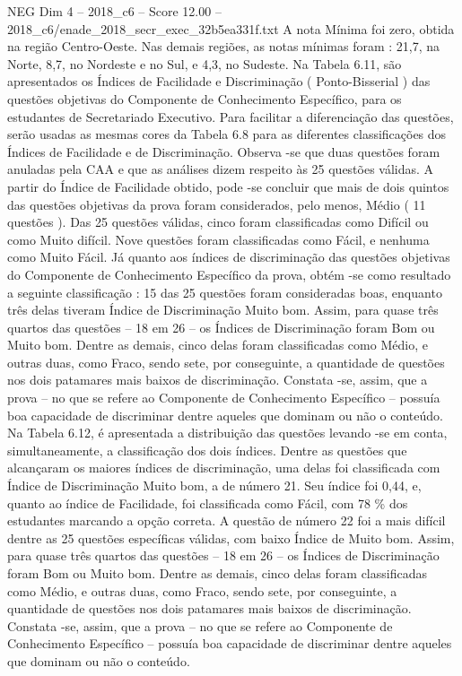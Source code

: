 \begin{textsample}{NEG Dim 4 – 2018\_c6 – Score 12.00 – 2018\_c6/enade\_2018\_secr\_exec\_32b5ea331f.txt}
A nota Mínima foi zero, obtida na região Centro-Oeste.
Nas demais regiões, as notas mínimas foram : 21,7, na Norte, 8,7, no Nordeste e no Sul, e 4,3, no Sudeste.
Na Tabela 6.11, são apresentados os Índices de Facilidade e Discriminação ( Ponto-Bisserial ) das questões objetivas do Componente de Conhecimento Específico, para os estudantes de Secretariado Executivo.
Para facilitar a diferenciação das questões, serão usadas as mesmas cores da Tabela 6.8 para as diferentes classificações dos Índices de Facilidade e de Discriminação.
Observa -se que duas questões foram anuladas pela CAA e que as análises dizem respeito às 25 questões válidas.
A partir do Índice de Facilidade obtido, pode -se concluir que mais de dois quintos das questões objetivas da prova foram considerados, pelo menos, Médio ( 11 questões ).
Das 25 questões válidas, cinco foram classificadas como Difícil ou como Muito difícil.
Nove questões foram classificadas como Fácil, e nenhuma como Muito Fácil.
Já quanto aos índices de discriminação das questões objetivas do Componente de Conhecimento Específico da prova, obtém -se como resultado a seguinte classificação : 15 das 25 questões foram consideradas boas, enquanto três delas tiveram Índice de Discriminação Muito bom.
Assim, para quase três quartos das questões – 18 em 26 – os Índices de Discriminação foram Bom ou Muito bom.
Dentre as demais, cinco delas foram classificadas como Médio, e outras duas, como Fraco, sendo sete, por conseguinte, a quantidade de questões nos dois patamares mais baixos de discriminação.
Constata -se, assim, que a prova – no que se refere ao Componente de Conhecimento Específico – possuía boa capacidade de discriminar dentre aqueles que dominam ou não o conteúdo.
Na Tabela 6.12, é apresentada a distribuição das questões levando -se em conta, simultaneamente, a classificação dos dois índices.
Dentre as questões que alcançaram os maiores índices de discriminação, uma delas foi classificada com Índice de Discriminação Muito bom, a de número 21.
Seu índice foi 0,44, e, quanto ao índice de Facilidade, foi classificada como Fácil, com 78 \% dos estudantes marcando a opção correta.
A questão de número 22 foi a mais difícil dentre as 25 questões específicas válidas, com baixo Índice de Muito bom.
Assim, para quase três quartos das questões – 18 em 26 – os Índices de Discriminação foram Bom ou Muito bom.
Dentre as demais, cinco delas foram classificadas como Médio, e outras duas, como Fraco, sendo sete, por conseguinte, a quantidade de questões nos dois patamares mais baixos de discriminação.
Constata -se, assim, que a prova – no que se refere ao Componente de Conhecimento Específico – possuía boa capacidade de discriminar dentre aqueles que dominam ou não o conteúdo.

\end{textsample}
